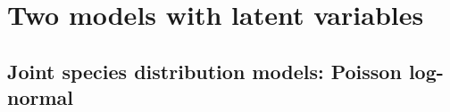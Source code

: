 \documentclass[8pt]{beamer}
\begin{document}
\section{Two models with latent variables}
\subsection[Joint species distribution models]{Joint species distribution models: Poisson log-normal}
\end{document}
